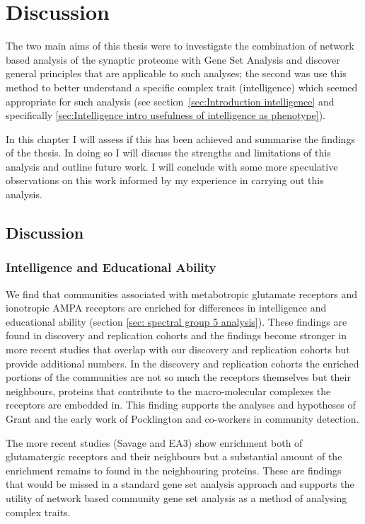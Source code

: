 \chapter{Discussion}

The two main aims of this thesis were to investigate the combination of network based analysis of the synaptic proteome with Gene Set Analysis and discover general  principles that are applicable to such analyses; the second was use this method to better understand a specific complex trait (intelligence) which seemed appropriate for such analysis (see section~\ref{sec:Introduction intelligence} and specifically  \ref{sec:Intelligence intro usefulness of intelligence as phenotype}).

In this chapter I will assess if this has been achieved and summarise the findings of the thesis. In doing so I will discuss the strengths and limitations of this analysis and outline future work. I will conclude with some more speculative observations on this work informed by my experience in carrying out this analysis.

\section{Discussion}
\subsection{Intelligence and Educational Ability}
We find that communities associated with metabotropic glutamate receptors and ionotropic AMPA receptors are enriched for differences in intelligence and educational ability (section \ref{sec: spectral group 5 analysis}). These findings are found in discovery and replication cohorts and the findings become stronger in more recent studies that overlap with our discovery and replication cohorts but provide additional numbers. 
In the discovery and replication cohorts the enriched portions of the communities are not so much the receptors themselves but their neighbours, proteins that contribute to the macro-molecular complexes the receptors are embedded in. This finding supports the analyses and hypotheses of Grant \cite{grant2012synaptopathies} and the early work of Pocklington and co-workers \cite{pocklington2006proteomes} in community detection. 

The more recent studies (Savage and EA3)\cite{savage2018genome} \cite{lee2018gene} show enrichment both of glutamatergic receptors and their neighbours but a substantial amount of the enrichment remains to found in the neighbouring proteins. These are findings that would be missed in a standard gene set analysis approach and supports the utility of network based community gene set analysis as a method of analysing complex traits. 

